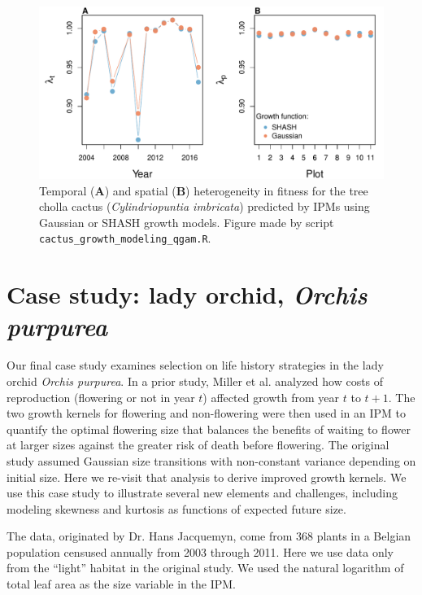 \documentclass[12pt]{article}
\begin{document}
\begin{spacing}{1.9}
\begin{figure}[tbp]
	\centering
	\includegraphics[width=1.0\textwidth]{figures/cactus_lambda_years_plots.pdf}
	\caption{Temporal (\textbf{A}) and spatial (\textbf{B}) heterogeneity in fitness for the tree cholla cactus (\textit{Cylindriopuntia imbricata}) predicted by IPMs using Gaussian or SHASH growth models. Figure made by script \texttt{cactus\_growth\_modeling\_qgam.R}.}
	\label{fig:cactus_lambda}
\end{figure} 

 
\section{Case study: lady orchid, \emph{Orchis purpurea}}
\label{sec:orchidCaseStudy} 
Our final case study examines selection on life history strategies in the lady orchid \textit{Orchis purpurea}. 
In a prior study, Miller et al. \citeyear{miller2012evolutionary} analyzed how costs of reproduction (flowering or not in year $t$) affected growth from year $t$ to $t+1$. 
The two growth kernels for flowering and non-flowering were then used in an IPM to quantify the optimal flowering size that balances the benefits of waiting to flower at larger sizes against the greater risk of death before flowering. 
The original study assumed Gaussian size transitions with non-constant variance depending on initial size. 
Here we re-visit that analysis to derive improved growth kernels.  
We use this case study to illustrate several new elements and challenges, including modeling skewness and kurtosis as functions of expected future size.

The data, originated by Dr. Hans Jacquemyn, come from 368 plants in a Belgian population censused annually from 2003 through 2011. 
Here we use data only from the ``light'' habitat in the original study. 
We used the natural logarithm of total leaf area as the size variable in the IPM. 


\end{spacing}
\end{document}
